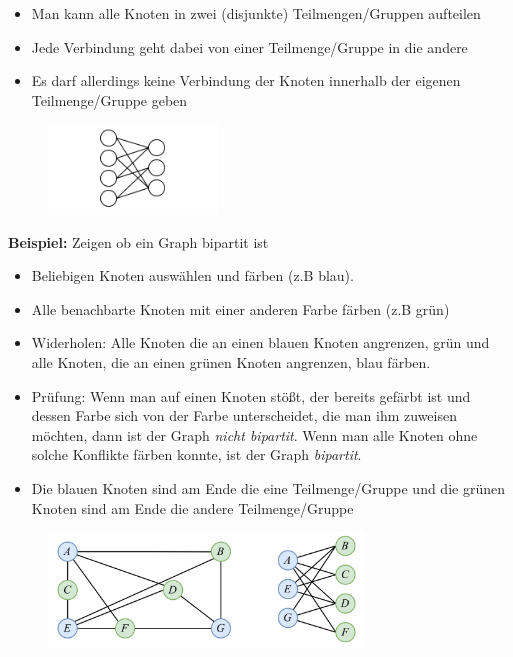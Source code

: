\begin{itemize}[leftmargin=*]
\item Man kann alle Knoten in zwei (disjunkte) Teilmengen/Gruppen aufteilen
\item Jede Verbindung geht dabei von einer Teilmenge/Gruppe in die andere
\item Es darf allerdings keine Verbindung der Knoten innerhalb der eigenen Teilmenge/Gruppe geben
\end{itemize}

\begin{figure}[h]
\centering
\includegraphics[width=0.4\textwidth]{graphics/graph_bipartit.png}
\end{figure}

\textbf{Beispiel:} Zeigen ob ein Graph bipartit ist

\begin{itemize}
\item Beliebigen Knoten auswählen und färben (z.B blau).
\item Alle benachbarte Knoten mit einer anderen Farbe färben (z.B grün)
\item Widerholen: Alle Knoten die an einen blauen Knoten angrenzen, grün und alle Knoten, die an einen grünen Knoten angrenzen, blau färben.
\item Prüfung: Wenn man auf einen Knoten stößt, der bereits gefärbt ist und dessen Farbe sich von der Farbe unterscheidet, die man ihm zuweisen möchten, dann ist der Graph \textit{nicht bipartit}. Wenn man alle Knoten ohne solche Konflikte färben konnte, ist der Graph \textit{bipartit}.
\item Die blauen Knoten sind am Ende die eine Teilmenge/Gruppe und die grünen Knoten sind am Ende die andere Teilmenge/Gruppe
\end{itemize}

\begin{figure}[h]
\centering
\includegraphics[width=0.75\textwidth]{graphics/graph_bipartit2.png}
\end{figure}

